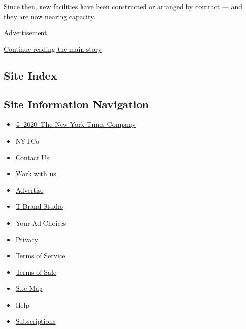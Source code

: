 Since then, new facilities have been constructed or arranged by contract
--- and they are now nearing capacity.

Advertisement

\protect\hyperlink{after-bottom}{Continue reading the main story}

\hypertarget{site-index}{%
\subsection{Site Index}\label{site-index}}

\hypertarget{site-information-navigation}{%
\subsection{Site Information
Navigation}\label{site-information-navigation}}

\begin{itemize}
\tightlist
\item
  \href{https://help.nytimes.com/hc/en-us/articles/115014792127-Copyright-notice}{©~2020~The
  New York Times Company}
\end{itemize}

\begin{itemize}
\tightlist
\item
  \href{https://www.nytco.com/}{NYTCo}
\item
  \href{https://help.nytimes.com/hc/en-us/articles/115015385887-Contact-Us}{Contact
  Us}
\item
  \href{https://www.nytco.com/careers/}{Work with us}
\item
  \href{https://nytmediakit.com/}{Advertise}
\item
  \href{http://www.tbrandstudio.com/}{T Brand Studio}
\item
  \href{https://www.nytimes.com/privacy/cookie-policy\#how-do-i-manage-trackers}{Your
  Ad Choices}
\item
  \href{https://www.nytimes.com/privacy}{Privacy}
\item
  \href{https://help.nytimes.com/hc/en-us/articles/115014893428-Terms-of-service}{Terms
  of Service}
\item
  \href{https://help.nytimes.com/hc/en-us/articles/115014893968-Terms-of-sale}{Terms
  of Sale}
\item
  \href{https://spiderbites.nytimes.com}{Site Map}
\item
  \href{https://help.nytimes.com/hc/en-us}{Help}
\item
  \href{https://www.nytimes.com/subscription?campaignId=37WXW}{Subscriptions}
\end{itemize}
